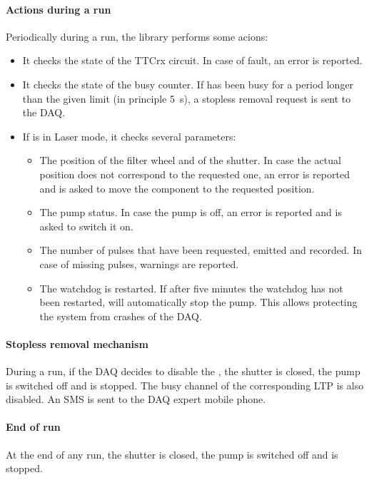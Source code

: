 \begin{itemize}
\paragraph{Actions during a run}
Periodically during a run, the \lasmodule{} library performs some acions:
\begin{itemize}
\item It checks the state of the \lascar{} TTCrx circuit. In case of fault, an error is reported.
\item It checks the state of the busy counter. If \lascar{} has been busy for a period longer
than the given limit (in principle 5~s), a stopless removal request is sent to the DAQ.
\item If \lascar{} is in Laser mode, it checks several parameters:
  \begin{itemize}
  \item The position of the filter wheel and of the shutter. In case the actual position does not
    correspond to the requested one, an error is reported and \lascar{} is asked to move the
    component to the requested position.
  \item The \las{} pump status. In case the pump is off, an error is reported and \lascar{} is
    asked to switch it on.
  \item The number of \las{} pulses that have been 
    requested, emitted and recorded. In case of missing pulses, warnings are reported.
  \item The \lascar{} watchdog is restarted. If after five minutes the watchdog has
    not been restarted, \lascar{} will automatically stop the \las{} pump. This allows protecting
    the \lasii{} system from crashes of the \atlas{} DAQ.
  \end{itemize}
\end{itemize}

\paragraph{Stopless removal mechanism}
During a run, if the \atlas{} DAQ decides to disable the \lasmodule{}, the shutter is closed,
the \las{} pump is switched off and \lascar{} is stopped. The busy channel of the corresponding
LTP is also disabled. An SMS is sent to the DAQ expert mobile phone.

\paragraph{End of run}
At the end of any run, the shutter is closed, the \las{} pump is switched off and \lascar{} is
stopped.


\end{itemize}
